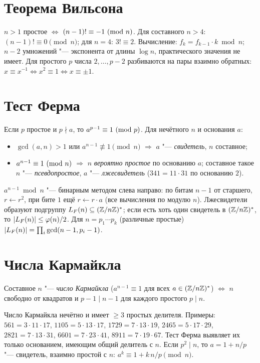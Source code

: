 \documentclass{ca-handout}
\begin{document}
\makehandouttitle

\section{Теорема Вильсона}
$n > 1$ простое $\iff$ $(n - 1)! \equiv -1\ (\mathrm{mod}\ n)$. Для составного $n > 4$: $(n - 1)! \equiv 0 \pmod n$;
для $n = 4$: $3! \equiv 2$. Вычисление: $f_k = f_{k-1} \cdot k \bmod n$; $n - 2$ умножений "---
экспонента от длины $\log n$, практического значения не имеет. Для простого $p$ числа
$2, \ldots, p - 2$ разбиваются на пары взаимно обратных: $x \equiv x^{-1} \iff x^2 \equiv 1 \iff x \equiv \pm 1$.

\section{Тест Ферма}
\begin{reminder}[title={Малая теорема Ферма и псевдопростые числа}]
Если $p$ простое и $p \nmid a$, то $a^{p-1} \equiv 1\ (\mathrm{mod}\ p)$. Для нечётного $n$ и основания $a$:
\begin{itemize}
  \item $\gcd(a, n) > 1$ или $a^{n-1} \not\equiv 1 \pmod n$ $\Rightarrow$ $a$ "--- \emph{свидетель}, $n$ составное;
  \item $a^{n-1} \equiv 1\ (\mathrm{mod}\ n)$ $\Rightarrow$ $n$ \emph{вероятно простое} по основанию $a$; составное
    такое $n$ "--- \emph{псевдопростое}, $a$ "--- \emph{лжесвидетель} ($341 = 11 \cdot 31$ по основанию $2$).
\end{itemize}
\end{reminder}
$a^{n-1} \bmod n$ "--- бинарным методом слева направо: по битам $n - 1$ от старшего, $r \gets r^2$,
при бите $1$ ещё $r \gets r \cdot a$ (все вычисления по модулю $n$). Лжесвидетели образуют
подгруппу $L_F(n) \subseteq (\mathbb{Z}/n\mathbb{Z})^{*}$; если есть хоть один свидетель в $(\mathbb{Z}/n\mathbb{Z})^{*}$, то
$\lvert L_F(n)\rvert \le \varphi(n)/2$. Для $n = p_1 \cdots p_k$ (различные простые)
$\lvert L_F(n)\rvert = \prod_i \gcd(n - 1, p_i - 1)$.

\section{Числа Кармайкла}
\begin{reminder}[title={Критерий Корсельта}]
Составное $n$ "--- \emph{число Кармайкла} ($a^{n-1} \equiv 1$ для всех $a \in (\mathbb{Z}/n\mathbb{Z})^{*}$) $\iff$
$n$ свободно от квадратов и $p - 1 \mid n - 1$ для каждого простого $p \mid n$.
\end{reminder}
Число Кармайкла нечётно и имеет $\ge 3$ простых делителя. Примеры: $561 = 3 \cdot 11 \cdot 17$,
$1105 = 5 \cdot 13 \cdot 17$, $1729 = 7 \cdot 13 \cdot 19$, $2465 = 5 \cdot 17 \cdot 29$,
$2821 = 7 \cdot 13 \cdot 31$, $6601 = 7 \cdot 23 \cdot 41$, $8911 = 7 \cdot 19 \cdot 67$.
Тест Ферма выявляет их только основанием, имеющим общий делитель с $n$. Если $p^2 \mid n$, то
$a = 1 + n/p$ "--- свидетель, взаимно простой с $n$: $a^{k} \equiv 1 + k\,n/p \pmod n$.
\end{document}
